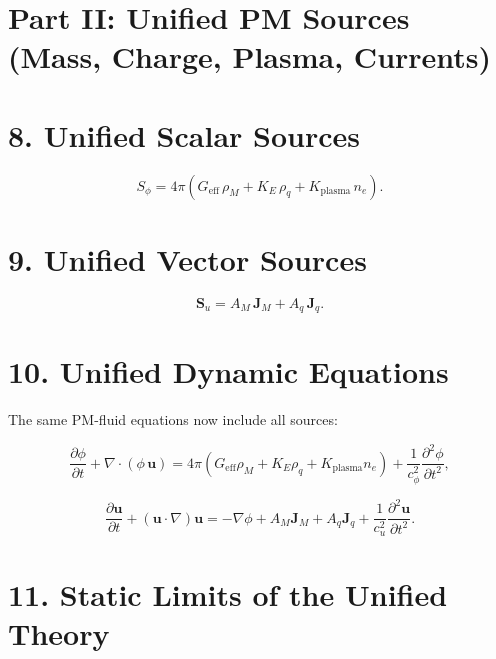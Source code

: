 \documentclass{article}
\begin{document}
\section*{Part II: Unified PM Sources (Mass, Charge, Plasma, Currents)}

\section*{8. Unified Scalar Sources}



\[
S_\phi = 4\pi\left(
G_{\mathrm{eff}}\,\rho_M
+ K_E\,\rho_q
+ K_{\mathrm{plasma}}\,n_e
\right).
\]



\section*{9. Unified Vector Sources}



\[
\mathbf S_u
= A_M\,\mathbf J_M
+ A_q\,\mathbf J_q.
\]



\section*{10. Unified Dynamic Equations}

The same PM-fluid equations now include all sources:



\[
\frac{\partial \phi}{\partial t}
+ \nabla\cdot(\phi\,\mathbf u)
=
4\pi(G_{\mathrm{eff}}\rho_M + K_E\rho_q + K_{\mathrm{plasma}}n_e)
+
\frac{1}{c_\phi^2}\frac{\partial^2 \phi}{\partial t^2},
\]



\[
\frac{\partial \mathbf u}{\partial t}
+ (\mathbf u\cdot\nabla)\mathbf u
=
-\nabla \phi
+ A_M\mathbf J_M + A_q\mathbf J_q
+ \frac{1}{c_u^2}\frac{\partial^2 \mathbf u}{\partial t^2}.
\]



\section*{11. Static Limits of the Unified Theory}
\end{document}
